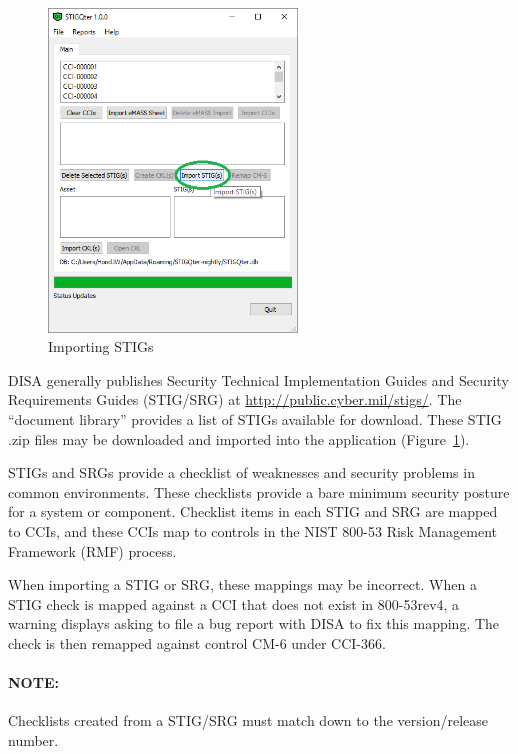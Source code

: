 \documentclass[letterpaper, 10pt, twoside]{article}
\begin{document}
\begin{figure}
	\centering
	\vspace{-10pt}
	\includegraphics[width=0.59\textwidth]{images/main-02.png}
	\caption{Importing STIGs}
	\vspace{-40pt}
	\label{fig:importstigs}
\end{figure}
DISA generally publishes Security Technical Implementation Guides and Security Requirements Guides (STIG/SRG) at \url{http://public.cyber.mil/stigs/}. The ``document library'' provides a list of STIGs available for download. These STIG .zip files may be downloaded and imported into the application (Figure~\ref{fig:importstigs}).

STIGs and SRGs provide a checklist of weaknesses and security problems in common environments. These checklists provide a bare minimum security posture for a system or component. Checklist items in each STIG and SRG are mapped to CCIs, and these CCIs map to controls in the NIST 800-53 Risk Management Framework (RMF) process.

When importing a STIG or SRG, these mappings may be incorrect. When a STIG check is mapped against a CCI that does not exist in 800-53rev4, a warning displays asking to file a bug report with DISA to fix this mapping. The check is then remapped against control CM-6 under CCI-366.

\paragraph{NOTE:} Checklists created from a STIG/SRG must match down to the version/release number.
\end{document}
